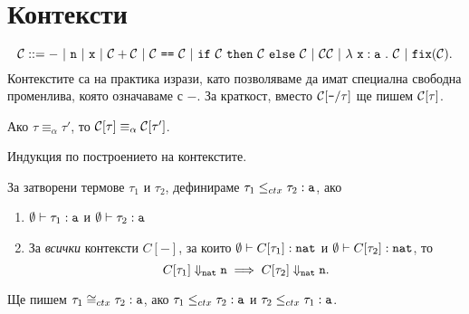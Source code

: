 \section{Контексти}\label{pcf:sect:context}

\[\C ::= -\ |\ \vv{n}\ |\ \vv{x}\ |\ \C + \C\ |\ \C\ \vv{==}\ \C\ |\ \ifelse{\C}{\C}{\C}\ |\ \C\C\ |\ \lamb{x}{a}{\C}\ |\ \fix(\C).\]
Контекстите са на практика изрази, като позволяваме да имат специална свободна променлива, която означаваме с $-$.
За краткост, вместо $\mathcal{C}[\texttt{-}/{\tau}]$ ще пишем $\mathcal{C}[\tau]$.

\begin{proposition}
  Ако $\tau \equiv_\alpha \tau'$, то $\mathcal{C}[\tau] \equiv_\alpha \mathcal{C}[\tau']$.
\end{proposition}
\begin{hint}
  Индукция по построението на контекстите.
\end{hint}

\begin{definition}
  За затворени термове $\tau_1$ и $\tau_2$, дефинираме
  $\tau_1 \leq_{ctx} \tau_2 : \texttt{a}$, ако
  \begin{enumerate}[1)]
  \item
    $\emptyset \vdash \tau_1 : \texttt{a}$ и $\emptyset \vdash \tau_2 : \texttt{a}$
  \item
    За \emph{всички} контексти $C[-]$, за които $\emptyset \vdash C[\tau_1] : \texttt{nat}$ и $\emptyset \vdash C[\tau_2] : \texttt{nat}$, то
    \[C[\tau_1] \Downarrow_{\texttt{nat}} \texttt{n} \implies C[\tau_2] \Downarrow_{\texttt{nat}} \texttt{n}.\]
  \end{enumerate}
  Ще пишем $\tau_1 \cong_{ctx} \tau_2 : \texttt{a}$, ако
  $\tau_1 \leq_{ctx} \tau_2 : \texttt{a}$ и $\tau_2 \leq_{ctx} \tau_1 : \texttt{a}$.
\end{definition}


